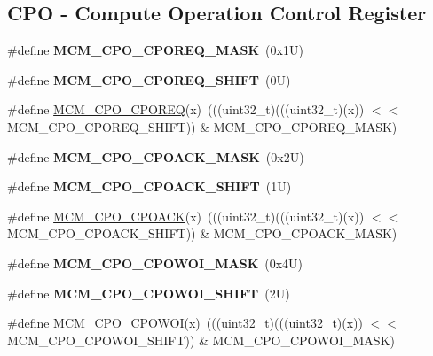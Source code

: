 \subsection*{C\+PO -\/ Compute Operation Control Register}
\begin{DoxyCompactItemize}
\item 
\mbox{\label{group___m_c_m___register___masks_ga36f43d6467fbe16e5585829747471da9}} 
\#define {\bfseries M\+C\+M\+\_\+\+C\+P\+O\+\_\+\+C\+P\+O\+R\+E\+Q\+\_\+\+M\+A\+SK}~(0x1\+U)
\item 
\mbox{\label{group___m_c_m___register___masks_ga4787ad168d88290f8da659a6b30e243d}} 
\#define {\bfseries M\+C\+M\+\_\+\+C\+P\+O\+\_\+\+C\+P\+O\+R\+E\+Q\+\_\+\+S\+H\+I\+FT}~(0\+U)
\item 
\#define \mbox{\hyperlink{group___m_c_m___register___masks_gad3ef6c52b02135ec94837bfcf71a800d}{M\+C\+M\+\_\+\+C\+P\+O\+\_\+\+C\+P\+O\+R\+EQ}}(x)~(((uint32\+\_\+t)(((uint32\+\_\+t)(x)) $<$$<$ M\+C\+M\+\_\+\+C\+P\+O\+\_\+\+C\+P\+O\+R\+E\+Q\+\_\+\+S\+H\+I\+FT)) \& M\+C\+M\+\_\+\+C\+P\+O\+\_\+\+C\+P\+O\+R\+E\+Q\+\_\+\+M\+A\+SK)
\item 
\mbox{\label{group___m_c_m___register___masks_ga039f47e9952c17908e79eace8fd0139c}} 
\#define {\bfseries M\+C\+M\+\_\+\+C\+P\+O\+\_\+\+C\+P\+O\+A\+C\+K\+\_\+\+M\+A\+SK}~(0x2\+U)
\item 
\mbox{\label{group___m_c_m___register___masks_gaa9a8977b3a452ae07fb7ca851c5ee47e}} 
\#define {\bfseries M\+C\+M\+\_\+\+C\+P\+O\+\_\+\+C\+P\+O\+A\+C\+K\+\_\+\+S\+H\+I\+FT}~(1\+U)
\item 
\#define \mbox{\hyperlink{group___m_c_m___register___masks_gad02869a7082243f4250d7bf210e7c54a}{M\+C\+M\+\_\+\+C\+P\+O\+\_\+\+C\+P\+O\+A\+CK}}(x)~(((uint32\+\_\+t)(((uint32\+\_\+t)(x)) $<$$<$ M\+C\+M\+\_\+\+C\+P\+O\+\_\+\+C\+P\+O\+A\+C\+K\+\_\+\+S\+H\+I\+FT)) \& M\+C\+M\+\_\+\+C\+P\+O\+\_\+\+C\+P\+O\+A\+C\+K\+\_\+\+M\+A\+SK)
\item 
\mbox{\label{group___m_c_m___register___masks_ga154f71ae507ca3bac1e2c2a9dbd1dcd5}} 
\#define {\bfseries M\+C\+M\+\_\+\+C\+P\+O\+\_\+\+C\+P\+O\+W\+O\+I\+\_\+\+M\+A\+SK}~(0x4\+U)
\item 
\mbox{\label{group___m_c_m___register___masks_ga369c1ed9bf00d8317ea868b2ea1b0572}} 
\#define {\bfseries M\+C\+M\+\_\+\+C\+P\+O\+\_\+\+C\+P\+O\+W\+O\+I\+\_\+\+S\+H\+I\+FT}~(2\+U)
\item 
\#define \mbox{\hyperlink{group___m_c_m___register___masks_ga67cd7144b5383315f372b397ddacc9a2}{M\+C\+M\+\_\+\+C\+P\+O\+\_\+\+C\+P\+O\+W\+OI}}(x)~(((uint32\+\_\+t)(((uint32\+\_\+t)(x)) $<$$<$ M\+C\+M\+\_\+\+C\+P\+O\+\_\+\+C\+P\+O\+W\+O\+I\+\_\+\+S\+H\+I\+FT)) \& M\+C\+M\+\_\+\+C\+P\+O\+\_\+\+C\+P\+O\+W\+O\+I\+\_\+\+M\+A\+SK)
\end{DoxyCompactItemize}


